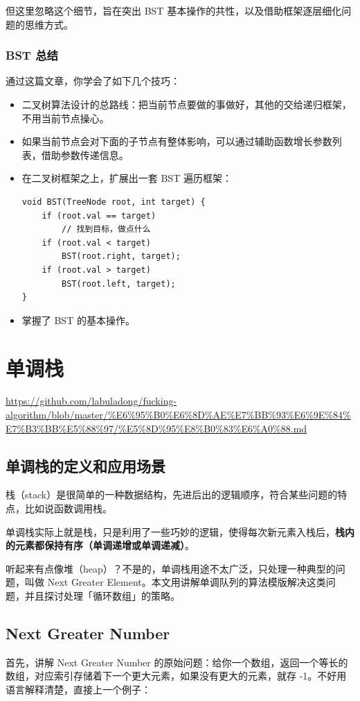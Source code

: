 \documentclass[12pt]{article}
\begin{document}
但这里忽略这个细节，旨在突出 BST 基本操作的共性，以及借助框架逐层细化问题的思维方式。

\subsubsection{BST 总结}
通过这篇文章，你学会了如下几个技巧：
\begin{itemize}
\setlength{\itemsep}{0pt}
\setlength{\parsep}{0pt}
\setlength{\parskip}{0pt}
    \item 二叉树算法设计的总路线：把当前节点要做的事做好，其他的交给递归框架，不用当前节点操心。
    \item 如果当前节点会对下面的子节点有整体影响，可以通过辅助函数增长参数列表，借助参数传递信息。
    \item 在二叉树框架之上，扩展出一套 BST 遍历框架：
    \begin{lstlisting}
void BST(TreeNode root, int target) {
    if (root.val == target)
        // 找到目标，做点什么
    if (root.val < target) 
        BST(root.right, target);
    if (root.val > target)
        BST(root.left, target);
}
\end{lstlisting}
    \item 掌握了 BST 的基本操作。
\end{itemize}

\section{单调栈}
\url{https://github.com/labuladong/fucking-algorithm/blob/master/%E6%95%B0%E6%8D%AE%E7%BB%93%E6%9E%84%E7%B3%BB%E5%88%97/%E5%8D%95%E8%B0%83%E6%A0%88.md}

\subsection{单调栈的定义和应用场景}
栈（stack）是很简单的一种数据结构，先进后出的逻辑顺序，符合某些问题的特点，比如说函数调用栈。

单调栈实际上就是栈，只是利用了一些巧妙的逻辑，使得每次新元素入栈后，\textbf{栈内的元素都保持有序（单调递增或单调递减）}。

听起来有点像堆（heap）？不是的，单调栈用途不太广泛，只处理一种典型的问题，叫做 Next Greater Element。本文用讲解单调队列的算法模版解决这类问题，并且探讨处理「循环数组」的策略。

\subsection{Next Greater Number}
首先，讲解 Next Greater Number 的原始问题：给你一个数组，返回一个等长的数组，对应索引存储着下一个更大元素，如果没有更大的元素，就存 -1。不好用语言解释清楚，直接上一个例子：
\end{document}

